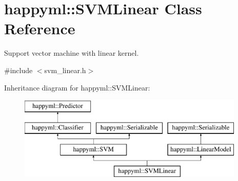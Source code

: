 \hypertarget{classhappyml_1_1SVMLinear}{}\section{happyml\+:\+:S\+V\+M\+Linear Class Reference}
\label{classhappyml_1_1SVMLinear}


Support vector machine with linear kernel.  




{\ttfamily \#include $<$svm\+\_\+linear.\+h$>$}

Inheritance diagram for happyml\+:\+:S\+V\+M\+Linear\+:\begin{figure}[H]
\begin{center}
\leavevmode
\includegraphics[height=4.000000cm]{classhappyml_1_1SVMLinear}
\end{center}
\end{figure}
